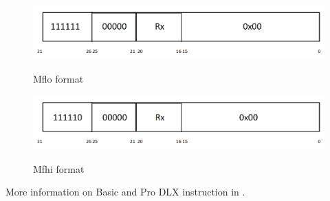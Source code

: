 \begin{figure}[H]
\centering
\includegraphics[scale=.6]{Immagini/03}
\label{03}
\caption{Mflo format}
\end{figure}

\begin{figure}[H]
\centering
\includegraphics[scale=.6]{Immagini/04}
\label{04}
\caption{Mfhi format}
\end{figure}

More information on Basic and Pro DLX instruction in \cite{ProjectSpecification}.